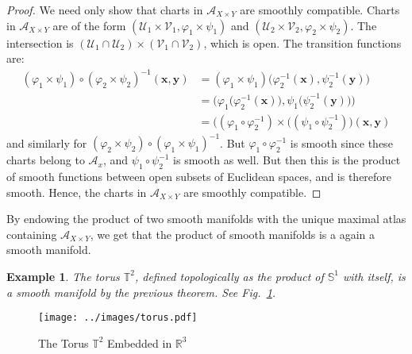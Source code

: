 \documentclass{article}
\theoremstyle{plain}
\theoremstyle{normal}
\newtheorem{example}{Example}[section]
\begin{document}
        \begin{proof}
            We need only show that charts in $\mathcal{A}_{X\times{Y}}$
            are smoothly compatible. Charts in
            $\mathcal{A}_{X\times{Y}}$ are of the form
            $(\mathcal{U}_{1}\times\mathcal{V}_{1},\varphi_{1}\times\psi_{1})$
            and
            $(\mathcal{U}_{2}\times\mathcal{V}_{2},\varphi_{2}\times\psi_{2})$.
            The intersection is
            $(\mathcal{U}_{1}\cap\mathcal{U}_{2})\times(\mathcal{V}_{1}\cap\mathcal{V}_{2})$,
            which is open. The transition functions are:
            \begin{align}
                (\varphi_{1}\times\psi_{1})\circ(\varphi_{2}\times\psi_{2})^{-1}
                (\mathbf{x},\mathbf{y})
                &=(\varphi_{1}\times\psi_{1})
                    \Big(\varphi_{2}^{-1}(\mathbf{x}),\psi_{2}^{-1}(\mathbf{y})\Big)\\
                &=\Big(
                    \varphi_{1}\big(
                        \varphi_{2}^{-1}(\mathbf{x})
                    \big),
                    \psi_{1}\big(
                        \psi_{2}^{-1}(\mathbf{y})
                    \big)
                \Big)\\
                &=\Big(
                    (\varphi_{1}\circ\varphi_{2}^{-1})\times(
                    (\psi_{1}\circ\psi_{2}^{-1})
                \Big)(\mathbf{x},\mathbf{y})
            \end{align}
            and similarly for
            $(\varphi_{2}\times\psi_{2})\circ(\varphi_{1}\times\psi_{1})^{-1}$.
            But $\varphi_{1}\circ\varphi_{2}^{-1}$ is smooth since these charts
            belong to $\mathcal{A}_{x}$, and $\psi_{1}\circ\psi_{2}^{-1}$ is
            smooth as well. But then this is the product of smooth functions
            between open subsets of Euclidean spaces, and is therefore smooth.
            Hence, the charts in $\mathcal{A}_{X\times{Y}}$ are smoothly
            compatible.
        \end{proof}
        By endowing the product of two smooth manifolds with the unique maximal
        atlas containing $\mathcal{A}_{X\times{Y}}$, we get that the product of
        smooth manifolds is a again a smooth manifold.
        \begin{example}
            The torus $\mathbb{T}^{2}$, defined topologically as the product
            of $\mathbb{S}^{1}$ with itself, is a smooth manifold by the
            previous theorem. See Fig.~\ref{fig:torus}.
        \end{example}
        \begin{figure}
            \centering
            \texttt{[image: ../images/torus.pdf]}
            \caption{The Torus $\mathbb{T}^{2}$ Embedded in $\mathbb{R}^{3}$}
            \label{fig:torus}
        \end{figure}
\end{document}
